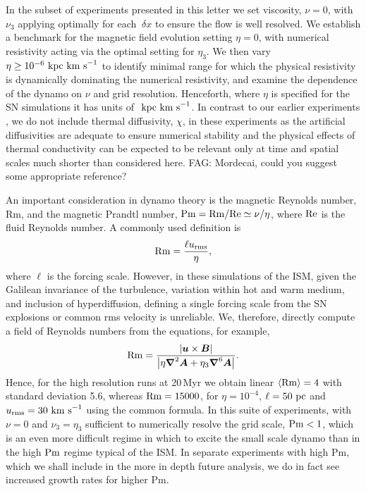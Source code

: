 \documentclass[preprint2]{aastex63}
\newcommand\Rm{{\rm Rm} }
\newcommand\Rey{{\rm Re} }
\newcommand\Pm{{\rm Pm} }
\newcommand{\vect}[1]{{{\mbox{\boldmath $#1$}}}}%
\newcommand\kpc{~ {\rm kpc}}
\newcommand\pc{~ {\rm pc}}
\newcommand\dx{~ {\delta x}}
\newcommand\kms{~ {\rm km~ s}^{-1}}
\newcommand{\fag}[1]{\textcolor{midgreen}{FAG: #1}}
\begin{document}
In the subset of experiments presented in this letter we set viscosity, $\nu=0$,
with $\nu_3$ applying optimally for each $\dx$ to ensure the flow is well
resolved.
We establish a benchmark for the magnetic field evolution setting $\eta=0$, with
numerical resistivity acting via the optimal setting for $\eta_3$.
We then vary $\eta\geq10^{-6}\kpc\kms$ to identify minimal range for which the
physical resistivity is dynamically dominating the numerical resistivity, and
examine the dependence of the dynamo on $\nu$ and grid resolution.
Henceforth, where $\eta$ is specified for the SN simulations it has units of
$\kpc\kms$. 
In contrast to our earlier experiments \citep{Gent:2013a,Gent:2013b,GMKSH20},
we do not include thermal diffusivity, $\chi$, in these experiments as the
artificial diffusivities are adequate to ensure numerical stability and the
physical effects of thermal conductivity can be expected to be relevant only
at time and spatial scales much shorter than considered here.
\fag{Mordecai, could you suggest some appropriate reference?}

An important consideration in dynamo theory is the magnetic Reynolds number, Rm,
and the magnetic Prandtl number, $\Pm = \Rm/\Rey \simeq \nu/\eta$, where $\Rey$
is the fluid Reynolds number.
A commonly used definition is \[\Rm=\frac{\ell u_{\rm rms}}{\eta},\] where
$\ell$ is the forcing scale.
However, in these simulations of the ISM, given the Galilean invariance of the 
turbulence, variation within hot and warm medium, and inclusion of
hyperdiffusion, defining a single forcing scale from the SN explosions or 
common rms velocity is unreliable.
We, therefore, directly compute a field of Reynolds numbers from the equations,
for example,
\begin{eqnarray}
  \Rm = \frac{\left|\vect{u}\times\vect{B}\right|}{
    \left|\eta\vect\nabla^2\vect{A}+\eta_3\vect\nabla^6\vect{A}\right|}.
\end{eqnarray}
Hence, for the high resolution runs at 20\,Myr we obtain linear 
$\langle\Rm\rangle=4$ with standard deviation 5.6, whereas 
$\Rm = 15000$, for $\eta=10^{-4}$, $\ell=50\pc$ and $u_{\rm rms}=30\kms$ using
the common formula.
In this suite of experiments, with $\nu=0$ and $\nu_3=\eta_3$ sufficient to
numerically resolve the grid scale, $\Pm<1$, which is an even more difficult
regime in which to excite the small scale dynamo than in the high $\Pm$
regime typical of the ISM.
In separate experiments with high Pm, which we shall include in the more in
depth future analysis, we do in fact see increased growth rates for higher
Pm.
\end{document}
